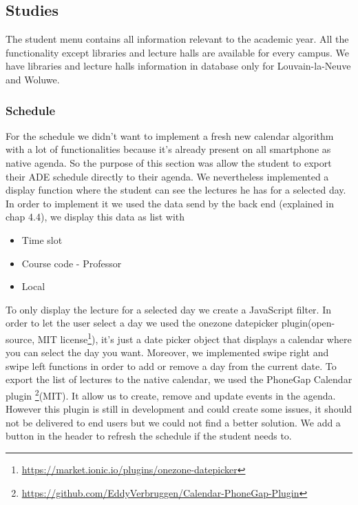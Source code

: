 \documentclass{eplmastersthesis}
\begin{document}
\subsection{Studies}
The student menu contains all information relevant to the academic year. All the functionality except libraries and lecture halls are available for every campus. We have libraries and lecture halls information in database only for Louvain-la-Neuve and Woluwe. 
\subsubsection{Schedule}
For the schedule we didn't want to implement a fresh new calendar algorithm with a lot of functionalities because it's already present on all smartphone as native agenda. So the purpose of this section was allow the student to export their ADE schedule directly to their agenda. We nevertheless implemented a display function where the student can see the lectures he has for a selected day. In order to implement it we used the data send by the back end (explained in chap 4.4), we display this data as list with
\begin{itemize}
\item Time slot
\item Course code - Professor
\item Local
\end{itemize}
To only display the lecture for a selected day we create a JavaScript filter. In order to let the user select a day we used the onezone datepicker plugin(open-source, MIT license\footnote{\url{https://market.ionic.io/plugins/onezone-datepicker}}), it's just a date picker object that displays a calendar where you can select the day you want. Moreover, we implemented swipe right and swipe left functions in order to add or remove a day from the current date.
To export the list of lectures to the native calendar, we used the PhoneGap Calendar plugin \footnote{\url{https://github.com/EddyVerbruggen/Calendar-PhoneGap-Plugin}}(MIT). It allow us to create, remove and update events in the agenda. However this plugin is still in development and could create some issues, it should not be delivered to end users but we could not find a better solution. We add a button in the header to refresh the schedule if the student needs to. 
\end{document}
